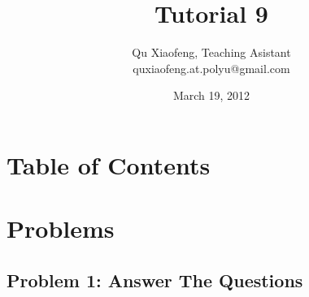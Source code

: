 \documentclass[
        ]{beamer}
\title{Tutorial 9}
\author[COMP435p]{Qu Xiaofeng\texorpdfstring{, Teaching Asistant\\\tiny{quxiaofeng.at.polyu@gmail.com}}{}}
\institute{COMP435p\\Biometrics Authentication}
\date{March 19, 2012}
\begin{document}
\newcommand{\inpdfu}[2]{\begin{figure}\centering\texttt{[image: im/lecture\_\#1]}\end{figure}}
\newcommand{\inpdfl}[2]{\begin{figure}\centering\texttt{[image: im/lecture\_\#1]}\end{figure}}
\newcommand{\inpdfc}[2]{\begin{figure}\centering\texttt{[image: im/lecture\_\#1]}\end{figure}}
\newcommand{\inpng}[1]{\begin{figure}\centering\texttt{[image: im/\#1]}\end{figure}}

\frame{\titlepage}

\section*{Table of Contents}

    \begin{frame}{\secname}
        \tableofcontents
    \end{frame}




\section{Problems}

    \subsection{Problem 1: Answer The Questions}
    
\end{document}
